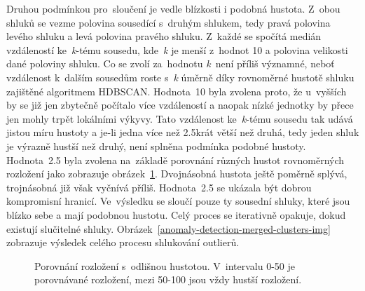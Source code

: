 Druhou podmínkou pro~sloučení je vedle blízkosti i podobná hustota. Z~obou shluků se vezme polovina sousedící s~druhým shlukem, tedy pravá polovina levého shluku a levá polovina pravého shluku. Z~každé se spočítá medián vzdáleností ke~\emph{k}-tému sousedu, kde~\emph{k} je menší z~hodnot 10 a polovina velikosti dané poloviny shluku. Co se zvolí za~hodnotu \emph{k}~není příliš významné, neboť vzdálenost k~dalším sousedům roste s~\emph{k} úměrně díky rovnoměrné hustotě shluku zajištěné algoritmem HDBSCAN. Hodnota~10 byla zvolena proto, že u~vyšších by se již jen zbytečně počítalo více vzdáleností a naopak nízké jednotky by přece jen mohly trpět lokálními výkyvy. Tato vzdálenost ke~\emph{k}-tému sousedu tak udává jistou míru hustoty a je-li jedna více než 2.5krát větší než druhá, tedy jeden shluk je výrazně hustší než druhý, není splněna podmínka podobné hustoty. Hodnota~2.5 byla zvolena na~základě porovnání různých hustot rovnoměrných rozložení jako zobrazuje obrázek~\ref{porovnani-hustot-img}. Dvojnásobná hustota ještě poměrně splývá, trojnásobná již však vyčnívá příliš. Hodnota~2.5 se ukázala být dobrou kompromisní hranicí. Ve~výsledku se sloučí pouze ty sousední shluky, které jsou blízko sebe a mají podobnou hustotu. Celý proces se iterativně opakuje, dokud existují slučitelné shluky. Obrázek~\ref{anomaly-detection-merged-clusters-img} zobrazuje výsledek celého procesu shlukování outlierů.

\begin{figure}[!hbt]
    \centering
    \caption{Porovnání rozložení s~odlišnou hustotou. V~intervalu 0-50 je porovnávané rozložení, mezi 50-100 jsou vždy hustší rozložení.}
    \label{porovnani-hustot-img}
\end{figure}

